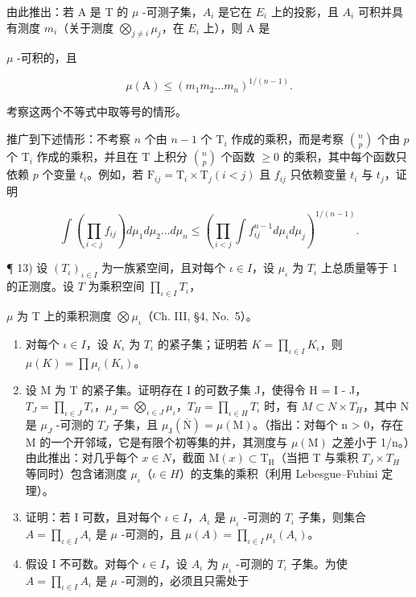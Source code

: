 由此推出：若 A 是 T 的 \(\mu\) -可测子集，\(A_{i}\) 是它在 \(E_{i}\) 上的投影，且 \(A_{i}\) 可积并具有测度 \(m_{i}\)（关于测度 \(\bigotimes_{j\neq i}\mu_{j}\)，在 \(E_{i}\) 上），则 A 是

\(\mu\) -可积的，且

\[
\mu (\mathrm{A}) \leqslant (m _ {1} m _ {2} \dots m _ {n}) ^ {1 / (n - 1)}.
\]

考察这两个不等式中取等号的情形。

推广到下述情形：不考察 \(n\) 个由 \(n - 1\) 个 \(\mathrm{T}_i\) 作成的乘积，而是考察 \(\binom{n}{p}\) 个由 \(p\) 个 \(\mathrm{T}_i\) 作成的乘积，并且在 \(\mathrm{T}\) 上积分 \(\binom{n}{p}\) 个函数 \(\geqslant 0\) 的乘积，其中每个函数只依赖 \(p\) 个变量 \(t_i\)。例如，若 \(\mathrm{F}_{ij} = \mathrm{T}_i \times \mathrm{T}_j (i < j)\) 且 \(f_{ij}\) 只依赖变量 \(t_i\) 与 \(t_j\)，证明

\[
\int \left(\prod_ {i <   j} f _ {i j}\right) d \mu_ {1} d \mu_ {2} \dots d \mu_ {n} \leqslant \left(\prod_ {i <   j} \int f _ {i j} ^ {n - 1} d \mu_ {i} d \mu_ {j}\right) ^ {1 / (n - 1)}.
\]

¶ 13) 设 \((T_{\iota})_{\iota \in I}\) 为一族紧空间，且对每个 \(\iota \in I\)，设 \(\mu_{\iota}\) 为 \(T_{\iota}\) 上总质量等于 1 的正测度。设 \(T\) 为乘积空间 \(\prod_{\iota \in I} T_{\iota}\)，

\(\mu\) 为 T 上的乘积测度 \(\bigotimes \mu_{\iota}\)（Ch. III, §4, No.~5）。

\begin{enumerate}
\def\labelenumi{\alph{enumi})}
\item
  对每个 \(\iota \in I\)，设 \(K_{\iota}\) 为 \(T_{\iota}\) 的紧子集；证明若 \(K = \prod_{\iota \in I} K_{\iota}\)，则 \(\mu(K) = \prod \mu_{\iota}(K_{\iota})\)。
\item
  设 M 为 T 的紧子集。证明存在 I 的可数子集 J，使得令 H = I - J，\(T_{J} = \prod_{\iota \in J} T_{\iota}\)，\(\mu_{J} = \bigotimes_{\iota \in J} \mu_{\iota}\)，\(T_{H} = \prod_{\iota \in H} T_{\iota}\) 时，有 \(M \subset N \times T_{H}\)，其中 N 是 \(\mu_{J}\) -可测的 \(T_{J}\) 子集，且 \(\mu_{\mathrm{J}}(\overline{\mathrm{N}}) = \mu(\mathrm{M})\)。（指出：对每个 n \textgreater{} 0，存在 M 的一个开邻域，它是有限个初等集的并，其测度与 \(\mu(\mathrm{M})\) 之差小于 1/n。）由此推出：对几乎每个 \(x \in N\)，截面 \(\mathrm{M}(x) \subset \mathrm{T}_{\mathrm{H}}\)（当把 T 与乘积 \(T_{J} \times T_{H}\) 等同时）包含诸测度 \(\mu_{\iota}\)（\(\iota \in H\)）的支集的乘积（利用 Lebesgue--Fubini 定理）。
\item
  证明：若 I 可数，且对每个 \(\iota \in I\)，\(A_{\iota}\) 是 \(\mu_{\iota}\) -可测的 \(T_{\iota}\) 子集，则集合 \(A = \prod_{\iota \in I} A_{\iota}\) 是 \(\mu\) -可测的，且 \(\mu(A) = \prod_{\iota \in I} \mu_{\iota}(A_{\iota})\)。
\item
  假设 I 不可数。对每个 \(\iota \in I\)，设 \(A_{\iota}\) 为 \(\mu_{\iota}\) -可测的 \(T_{\iota}\) 子集。为使 \(A = \prod_{\iota \in I} A_{\iota}\) 是 \(\mu\) -可测的，必须且只需处于
\end{enumerate}

